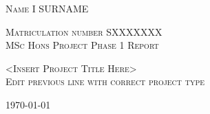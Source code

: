 %
%
%

\thispagestyle{empty}

\begin{titlepage}

  \vspace*{80pt}
  \begin{center}

    \begin{minipage}[c][][t]{8cm}
      \begin{center}

        \textsc{Name I SURNAME}
        
        \textsc{
		\small{Matriculation number SXXXXXXX}\\
	\small{MSc Hons Project Phase 1 Report}}
	
	\textsc{
          <Insert Project Title Here>\\
  	Edit previous line with correct project type}
        
	
	\textsc{\today}

        \vfill

      \end{center}
    \end{minipage}
  \end{center}

\end{titlepage}

\thispagestyle{empty}
\cleardoublepage
